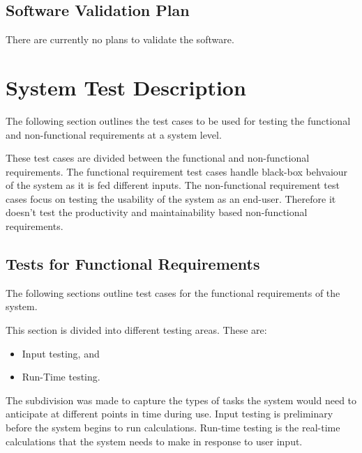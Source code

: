 \documentclass[12pt, titlepage]{article}
\begin{document}

\subsection{Software Validation Plan}
There are currently no plans to validate the software.  

\section{System Test Description}
The following section outlines the test cases to be used for testing the 
functional and non-functional requirements at a system level.

These test cases are divided between the functional and non-functional 
requirements. The functional requirement test cases handle black-box behvaiour
of the system as it is fed different inputs. The non-functional requirement 
test cases focus on testing the usability of the system as an end-user. 
Therefore it doesn't test the productivity and maintainability based 
non-functional requirements.

\subsection{Tests for Functional Requirements}
The following sections outline test cases for the functional requirements of 
the system.

This section is divided into different testing areas. These are:

\begin{itemize}
	\item Input testing, and
	\item Run-Time testing.
\end{itemize}

The subdivision was made to capture the types of tasks the system would need to 
anticipate at different points in time during use. Input testing is preliminary 
before the system begins to run calculations. Run-time testing is the real-time 
calculations that the system needs to make in response to user input.
\end{document}
